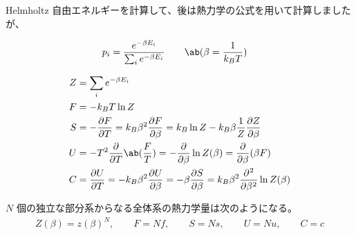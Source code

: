 \documentclass[a4paper,11pt]{jlreq}
\begin{document}
Helmholtz 自由エネルギーを計算して、後は熱力学の公式を用いて計算しましたが、
\begin{definition}
  \begin{align}
    p_i & = \frac{e^{-\beta E_i}}{\sum_{i}e^{-\beta E_i}} \qquad \ab(\beta = \dfrac{1}{k_BT})
  \end{align}
\end{definition}

\begin{theorem}
  \begin{align}
    Z & = \sum_{i}e^{-\beta E_i}                                                                                         \\
    F & = -k_BT\ln Z                                                                                                     \\
    S & = -\diffp{F}{T} = k_B\beta^2\diffp{F}{\beta} = k_B\ln Z - k_B\beta\frac{1}{Z}\diffp{Z}{\beta}                    \\
    U & = -T^2\diffp{}{T}\ab(\frac{F}{T}) = -\diffp{}{\beta}\ln Z(\beta) = \diffp{}{\beta}(\beta F)                      \\
    C & = \diffp{U}{T} = -k_B\beta^2\diffp{U}{\beta} = -\beta\diffp{S}{\beta} = k_B\beta^2\diffp[2]{}{\beta}\ln Z(\beta)
  \end{align}
\end{theorem}

\begin{theorem}
  $N$ 個の独立な部分系からなる全体系の熱力学量は次のようになる。
  \begin{align}
    Z(\beta) = z(\beta)^N, \qquad F = Nf, \qquad S = Ns, \qquad U = Nu, \qquad C = c
  \end{align}
\end{theorem}
\end{document}
